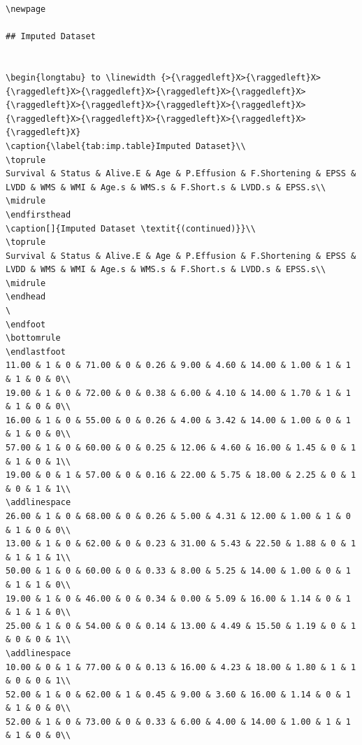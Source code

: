 \documentclass[
]{article}
\begin{document}
\begin{verbatim}
\newpage

## Imputed Dataset


\begin{longtabu} to \linewidth {>{\raggedleft}X>{\raggedleft}X>{\raggedleft}X>{\raggedleft}X>{\raggedleft}X>{\raggedleft}X>{\raggedleft}X>{\raggedleft}X>{\raggedleft}X>{\raggedleft}X>{\raggedleft}X>{\raggedleft}X>{\raggedleft}X>{\raggedleft}X>{\raggedleft}X}
\caption{\label{tab:imp.table}Imputed Dataset}\\
\toprule
Survival & Status & Alive.E & Age & P.Effusion & F.Shortening & EPSS & LVDD & WMS & WMI & Age.s & WMS.s & F.Short.s & LVDD.s & EPSS.s\\
\midrule
\endfirsthead
\caption[]{Imputed Dataset \textit{(continued)}}\\
\toprule
Survival & Status & Alive.E & Age & P.Effusion & F.Shortening & EPSS & LVDD & WMS & WMI & Age.s & WMS.s & F.Short.s & LVDD.s & EPSS.s\\
\midrule
\endhead
\
\endfoot
\bottomrule
\endlastfoot
11.00 & 1 & 0 & 71.00 & 0 & 0.26 & 9.00 & 4.60 & 14.00 & 1.00 & 1 & 1 & 1 & 0 & 0\\
19.00 & 1 & 0 & 72.00 & 0 & 0.38 & 6.00 & 4.10 & 14.00 & 1.70 & 1 & 1 & 1 & 0 & 0\\
16.00 & 1 & 0 & 55.00 & 0 & 0.26 & 4.00 & 3.42 & 14.00 & 1.00 & 0 & 1 & 1 & 0 & 0\\
57.00 & 1 & 0 & 60.00 & 0 & 0.25 & 12.06 & 4.60 & 16.00 & 1.45 & 0 & 1 & 1 & 0 & 1\\
19.00 & 0 & 1 & 57.00 & 0 & 0.16 & 22.00 & 5.75 & 18.00 & 2.25 & 0 & 1 & 0 & 1 & 1\\
\addlinespace
26.00 & 1 & 0 & 68.00 & 0 & 0.26 & 5.00 & 4.31 & 12.00 & 1.00 & 1 & 0 & 1 & 0 & 0\\
13.00 & 1 & 0 & 62.00 & 0 & 0.23 & 31.00 & 5.43 & 22.50 & 1.88 & 0 & 1 & 1 & 1 & 1\\
50.00 & 1 & 0 & 60.00 & 0 & 0.33 & 8.00 & 5.25 & 14.00 & 1.00 & 0 & 1 & 1 & 1 & 0\\
19.00 & 1 & 0 & 46.00 & 0 & 0.34 & 0.00 & 5.09 & 16.00 & 1.14 & 0 & 1 & 1 & 1 & 0\\
25.00 & 1 & 0 & 54.00 & 0 & 0.14 & 13.00 & 4.49 & 15.50 & 1.19 & 0 & 1 & 0 & 0 & 1\\
\addlinespace
10.00 & 0 & 1 & 77.00 & 0 & 0.13 & 16.00 & 4.23 & 18.00 & 1.80 & 1 & 1 & 0 & 0 & 1\\
52.00 & 1 & 0 & 62.00 & 1 & 0.45 & 9.00 & 3.60 & 16.00 & 1.14 & 0 & 1 & 1 & 0 & 0\\
52.00 & 1 & 0 & 73.00 & 0 & 0.33 & 6.00 & 4.00 & 14.00 & 1.00 & 1 & 1 & 1 & 0 & 0\\

\end{verbatim}
\end{document}
